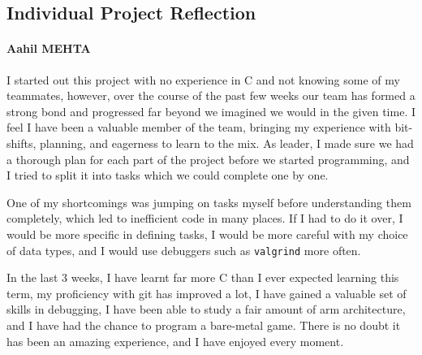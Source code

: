 \documentclass[11pt]{article}
\begin{document}
\subsection{Individual Project Reflection}

\paragraph{Aahil MEHTA} I started out this project with no experience in C and not knowing some of my teammates, however, over the course of the past few weeks our team has formed a strong bond and progressed far beyond we imagined we would in the given time. I feel I have been a valuable member of the team, bringing my experience with bit-shifts, planning, and eagerness to learn to the mix. As leader, I made sure we had a thorough plan for each part of the project before we started programming, and I tried to split it into tasks which we could complete one by one. 
\par One of my shortcomings was jumping on tasks myself before understanding them completely, which led to inefficient code in many places. If I had to do it over, I would be more specific in defining tasks, I would be more careful with my choice of data types, and I would use debuggers such as \texttt{valgrind} more often.
\par In the last 3 weeks, I have learnt far more C than I ever expected learning this term, my proficiency with git has improved a lot, I have gained a valuable set of skills in debugging, I have been able to study a fair amount of arm architecture, and I have had the chance to program a bare-metal game. There is no doubt it has been an amazing experience, and I have enjoyed every moment.
\end{document}
